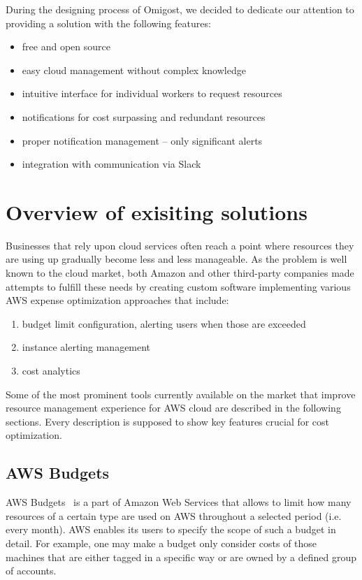 \documentclass[licencjacka,en]{thesisclass}
\begin{document}
    During the designing process of Omigost, we decided to dedicate our
    attention to providing a solution with the following features:
    \begin{itemize}
        \item free and open source
        \item easy cloud management without complex knowledge
        \item intuitive interface for individual workers to request resources
        \item notifications for cost surpassing and redundant resources
        \item proper notification management -- only significant alerts
        \item integration with communication via Slack
    \end{itemize}

    \section{Overview of exisiting solutions}

    Businesses that rely upon cloud services often reach a point where resources
    they are using up gradually become less and less manageable.
    As the problem is well known to the cloud market, both Amazon
    and other third-party companies made attempts to fulfill these needs
    by creating custom software implementing various AWS expense optimization approaches
    that include:

    \begin{enumerate}
        \item budget limit configuration, alerting users when those are exceeded
        \item instance alerting management
        \item cost analytics
    \end{enumerate}

    Some of the most prominent tools currently available
    on the market that improve resource management experience
    for AWS cloud are described in the following sections.
    Every description is supposed to show key features crucial for cost optimization.

    \subsection{AWS Budgets}

    AWS Budgets~\cite{AWSDocs} is a part of Amazon Web Services that allows
    to limit how many resources of a certain type are used on AWS
    throughout a selected period (i.e. every month).
    AWS enables its users to specify the scope of such a budget in detail.
    For example, one may make a budget only consider costs of those machines
    that are either tagged in a specific way
    or are owned by a defined group of accounts.
\end{document}
